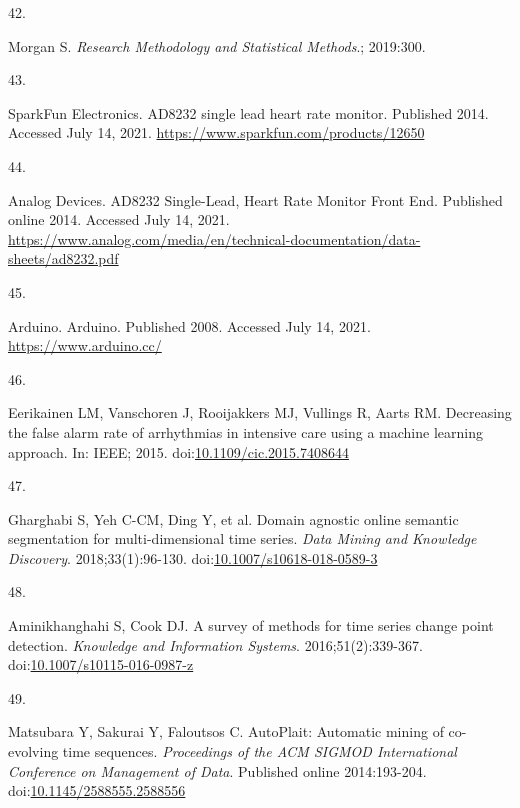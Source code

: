 \documentclass[12pt,twoside]{fmupthesis}
\newlength{\csllabelwidth}
\newlength{\cslhangindent}
\newenvironment{CSLReferences}[2] %
 {%
  \setlength{\parindent}{0pt}
  \ifodd #1 \everypar{\setlength{\hangindent}{\cslhangindent}}\ignorespaces\fi
  \ifnum #2 > 0
  \setlength{\parskip}{#2\baselineskip}
  \fi
 }%
 {}
\newcommand{\CSLLeftMargin}[1]{\parbox[t]{\csllabelwidth}{#1}}
\newcommand{\CSLRightInline}[1]{\parbox[t]{\linewidth - \csllabelwidth}{#1}}
\begin{document}
\begin{CSLReferences}{0}{0}
\leavevmode{}%
\CSLLeftMargin{42. }
\CSLRightInline{Morgan S. \emph{{Research Methodology and Statistical Methods}}.; 2019:300.}

\leavevmode{}%
\CSLLeftMargin{43. }
\CSLRightInline{SparkFun Electronics. AD8232 single lead heart rate monitor. Published 2014. Accessed July 14, 2021. \url{https://www.sparkfun.com/products/12650}}

\leavevmode{}%
\CSLLeftMargin{44. }
\CSLRightInline{Analog Devices. {AD8232 Single-Lead, Heart Rate Monitor Front End}. Published online 2014. Accessed July 14, 2021. \url{https://www.analog.com/media/en/technical-documentation/data-sheets/ad8232.pdf}}

\leavevmode{}%
\CSLLeftMargin{45. }
\CSLRightInline{Arduino. {Arduino}. Published 2008. Accessed July 14, 2021. \url{https://www.arduino.cc/}}

\leavevmode{}%
\CSLLeftMargin{46. }
\CSLRightInline{Eerikainen LM, Vanschoren J, Rooijakkers MJ, Vullings R, Aarts RM. Decreasing the false alarm rate of arrhythmias in intensive care using a machine learning approach. In: IEEE; 2015. doi:\href{https://doi.org/10.1109/cic.2015.7408644}{10.1109/cic.2015.7408644}}

\leavevmode{}%
\CSLLeftMargin{47. }
\CSLRightInline{Gharghabi S, Yeh C-CM, Ding Y, et al. Domain agnostic online semantic segmentation for multi-dimensional time series. \emph{Data Mining and Knowledge Discovery}. 2018;33(1):96-130. doi:\href{https://doi.org/10.1007/s10618-018-0589-3}{10.1007/s10618-018-0589-3}}

\leavevmode{}%
\CSLLeftMargin{48. }
\CSLRightInline{Aminikhanghahi S, Cook DJ. A survey of methods for time series change point detection. \emph{Knowledge and Information Systems}. 2016;51(2):339-367. doi:\href{https://doi.org/10.1007/s10115-016-0987-z}{10.1007/s10115-016-0987-z}}

\leavevmode{}%
\CSLLeftMargin{49. }
\CSLRightInline{Matsubara Y, Sakurai Y, Faloutsos C. AutoPlait: Automatic mining of co-evolving time sequences. \emph{Proceedings of the ACM SIGMOD International Conference on Management of Data}. Published online 2014:193-204. doi:\href{https://doi.org/10.1145/2588555.2588556}{10.1145/2588555.2588556}}


\end{CSLReferences}
\end{document}
